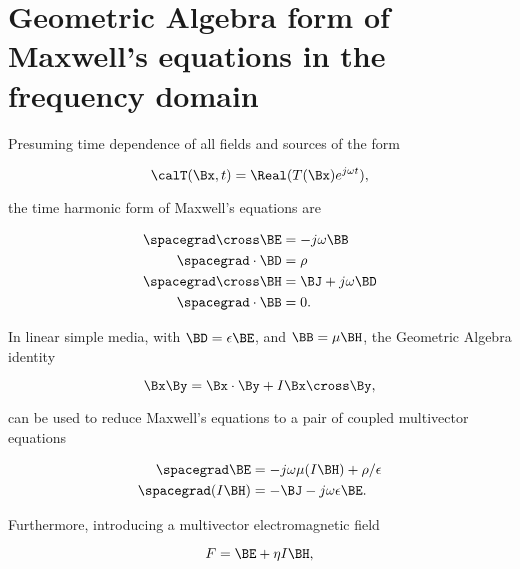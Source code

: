 %
%
\section{Geometric Algebra form of Maxwell's equations in the frequency domain}

Presuming time dependence of all fields and sources of the form

\begin{dmath}\label{eqn:frequencydomainCore:20}
\calT(\Bx, t) = \Real( T(\Bx) e^{j \omega t} ),
\end{dmath}

the time harmonic form of Maxwell's equations are

\begin{dmath}\label{eqn:frequencydomainCore:40}
\begin{aligned}
\spacegrad \cross \BE &= -j \omega \BB \\
\spacegrad \cdot \BD &= \rho \\
\spacegrad \cross \BH &= \BJ + j \omega \BD \\
\spacegrad \cdot \BB &= 0.
\end{aligned}
\end{dmath}

In linear simple media, with \( \BD = \epsilon \BE \), and \( \BB = \mu \BH \), the Geometric Algebra identity

\begin{dmath}\label{eqn:frequencydomainCore:120}
\Bx \By = \Bx \cdot \By + I \Bx \cross \By,
\end{dmath}

can be used to reduce Maxwell's equations to a pair of coupled multivector equations

\begin{dmath}\label{eqn:frequencydomainCore:60}
\begin{aligned}
\spacegrad \BE     &= -j \omega \mu (I \BH) + \rho/\epsilon \\
\spacegrad (I \BH) &= -\BJ - j \omega \epsilon \BE.
\end{aligned}
\end{dmath}

Furthermore, introducing a multivector electromagnetic field

\begin{dmath}\label{eqn:frequencydomainCore:80}
F = \BE + \eta I \BH,
\end{dmath}


